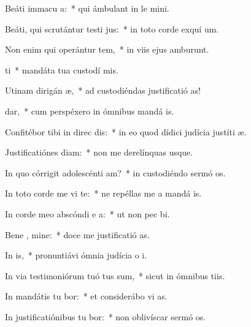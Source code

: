 \item Beáti immacu  a:~* qui ámbulant in le mini.
\item Beáti, qui scrutántur testi jus:~* in toto corde exquí um.
\item Non enim qui operántur tem,~* in viis ejus amburunt.
\item {} ti~* mandáta tua custodí mis.
\item Utinam dirigán  æ,~* ad custodiéndas justificatió as!
\item {}  dar,~* cum perspéxero in ómnibus mandá is.
\item Confitébor tibi in direc dis:~* in eo quod dídici judícia justíti æ.
\item Justificatiónes  diam:~* non me derelínquas usque.
\item In quo córrigit adolescénti  am?~* in custodiéndo sermó os.
\item In toto corde me vi te:~* ne repéllas me a mandá is.
\item In corde meo abscóndi e a:~* ut non pec bi.
\item Bene , mine:~* doce me justificatió as.
\item In  is,~* pronuntiávi ómnia judícia o i.
\item In via testimoniórum tuó tus sum,~* sicut in ómnibus tiis.
\item In mandátis tu bor:~* et considerábo vi as.
\item In justificatiónibus tu bor:~* non oblivíscar sermó os.
